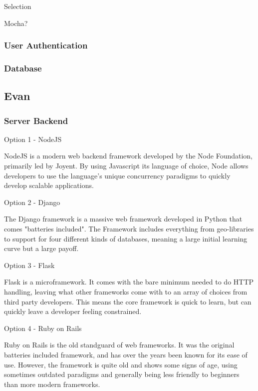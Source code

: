 \documentclass[letterpaper, 10pt, draftclsnofoot, compsoc, onecolumn]{IEEEtran}
\begin{document}
{\medskip
{\noindent Selection \par}
{\noindent Mocha? \par}




\newpage

\medskip

\subsubsection{User Authentication}
{\noindent \par}

\medskip

\subsubsection{Database}
{\noindent \par}

\medskip


\newpage
\subsection{Evan}
\vspace{1pc}
\subsubsection{Server Backend}
{\noindent Option 1 - NodeJS \par}
{\noindent NodeJS is a modern web backend framework developed by the Node Foundation,
primarily led by Joyent. By using Javascript its language of choice, Node allows
developers to use the language's unique concurrency paradigms to quickly develop
scalable applications. \par}
{\noindent Option 2 - Django \par}
{\noindent The Django framework is a massive web framework developed in Python that comes "batteries
included". The Framework includes everything from geo-libraries to support for four different kinds of
databases, meaning a large initial learning curve but a large payoff. \par}
{\noindent Option 3 - Flask \par}
{\noindent Flask is a microframework. It comes with the bare minimum needed to do HTTP handling, leaving
what other frameworks come with to an array of choices from third party developers. This means the core
framework is quick to learn, but can quickly leave a developer feeling constrained. \par}
{\noindent Option 4 - Ruby on Rails \par}
{\noindent Ruby on Rails is the old standguard of web frameworks. It was the original batteries included
framework, and has over the years been known for its ease of use. However, the framework is quite old
and shows some signs of age, using sometimes outdated paradigms and generally being less friendly to beginners
than more modern frameworks. \par}

}
\end{document}
